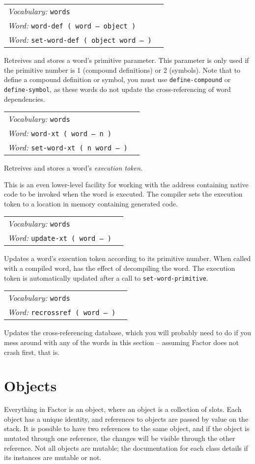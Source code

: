 \documentclass{book}
\newcommand{\vocabulary}[1]{\emph{Vocabulary:} \texttt{#1}&\\}
\newcommand{\ordinaryword}[2]{\index{\texttt{#1}}\emph{Word:} \texttt{#2}&\\}
\newcommand{\wordtable}[1]{


\begin{tabularx}{12cm}{lX}
\hline
#1
\hline
\end{tabularx}

}
\begin{document}
\wordtable{
\vocabulary{words}
\ordinaryword{word-def}{word-def ( word -- object )}
\ordinaryword{set-word-def}{set-word-def ( object word -- )}

}
Retreives and stores a word's primitive parameter. This parameter is only used if the primitive number is 1 (compound definitions) or 2 (symbols). Note that to define a compound definition or symbol, you must use \texttt{define-compound} or \texttt{define-symbol}, as these words do not update the cross-referencing of word dependencies.

\wordtable{
\vocabulary{words}
\ordinaryword{word-xt}{word-xt ( word -- n )}
\ordinaryword{set-word-xt}{set-word-xt ( n word -- )}

}
Retreives and stores a word's \emph{execution token}.

This is an even lower-level facility for working with the address containing native code to be invoked when the word is executed. The compiler sets the execution token to a location in memory containing generated code.

\wordtable{
\vocabulary{words}
\ordinaryword{update-xt}{update-xt ( word -- )}

}
Updates a word's execution token according to its primitive number. When called with a compiled word, has the effect of decompiling the word. The execution token is automatically updated after a call to \texttt{set-word-primitive}.

\wordtable{
\vocabulary{words}
\ordinaryword{recrossref}{recrossref ( word -- )}

}
Updates the cross-referencing database, which you will probably need to do if you mess around with any of the words in this section -- assuming Factor does not crash first, that is.

\section{Objects}

\mutableglos

Everything in Factor is an object, where an object is a collection of slots. Each object has a unique identity, and references to objects are passed by value on the stack. It is possible to have two references to the same object, and if the object is mutated through one reference, the changes will be visible through the other reference. Not all objects are mutable; the documentation for each class details if its instances are mutable or not.
\end{document}
